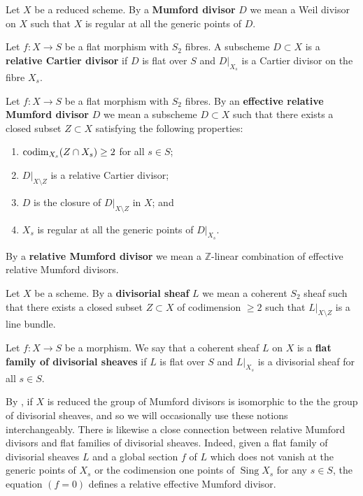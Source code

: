 \documentclass[12pt, a4paper]{amsart}
\DeclareMathOperator{\sing}{Sing}
\theoremstyle{definition}
\theoremstyle{named}
\begin{document}
Let $X$ be a reduced scheme. By a {\bf Mumford divisor} $D$
we mean a Weil divisor on $X$ such that $X$ is regular at 
all the generic points of $D$.

Let $f\colon X \to S$ be a flat morphism with $S_2$ fibres.
A subscheme $D \subset X$ is a {\bf relative Cartier divisor}
if $D$ is flat over $S$ and $D|_{X_s}$ is a Cartier divisor on the fibre $X_s$.


Let $f\colon X \rightarrow S$ be a flat morphism 
with $S_2$ fibres. By an {\bf effective relative Mumford divisor} $D$ we mean a subscheme $D \subset X$ such that there exists a closed subset $Z \subset X$ satisfying the following properties:
\begin{enumerate}
\item ${\rm codim}_{X_s}(Z \cap X_s) \ge 2$ for all $s \in S$; 

\item $D|_{X \setminus Z}$ is a relative Cartier divisor;

\item $D$ is the closure of $D|_{X\setminus Z}$ in $X$; and 

\item $X_s$ is regular at all the generic points of $D\vert_{X_s}$. 
\end{enumerate}
By a {\bf relative Mumford divisor} we mean a $\mathbb Z$-linear combination of effective relative Mumford divisors. 


Let $X$ be a scheme.  By a {\bf divisorial sheaf} $L$
we mean a coherent $S_2$ sheaf such that there exists a closed subset $Z \subset X$ of codimension $\ge 2$ such that $L\vert_{X \setminus Z}$ is a line bundle. 

Let $f\colon X \rightarrow S$ be a morphism. 
We say that a coherent sheaf $L$ on $X$ is a {\bf flat family of divisorial 
sheaves} if $L$ is flat over $S$ and $L\vert_{X_s}$ is a divisorial sheaf for all $s \in S$.

By \cite[Proposition 4]{Kollar2018}, if $X$ is reduced the group 
of Mumford divisors is isomorphic to the the group
of divisorial sheaves, and so we will occasionally use these notions interchangeably.
There is likewise a close connection between relative Mumford divisors and flat families of divisorial sheaves.  Indeed, given a flat family of divisorial sheaves $L$ and a global section $f$ of $L$ 
which does not vanish at the generic points of $X_s$ or the codimension one points of 
$\sing X_s$ for any $s \in S$, 
the equation $(f = 0)$ defines a relative effective Mumford divisor.
\end{document}
